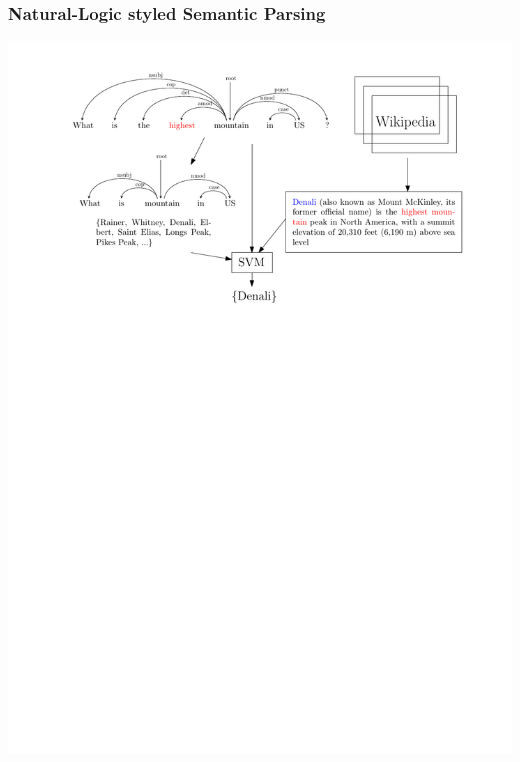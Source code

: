 \documentclass[mathserif,12pt]{beamer}
\begin{document}
\begin{frame}
\frametitle{Natural-Logic styled Semantic Parsing}
\centering
\includegraphics[scale=0.7]{figures/natural-logic-argmax-flowchart}
\end{frame} 
\end{document}
